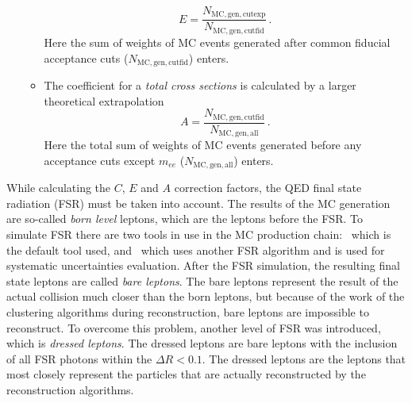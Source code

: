 \begin{itemize}
\begin{itemize}
\begin{equation}
  E = \frac{N_\mathrm{MC, gen, cutexp}}{N_\mathrm{MC, gen, cutfid}}\,.
\end{equation}
Here the sum of weights of MC events generated after common fiducial acceptance cuts ($N_\mathrm{MC, gen, cutfid}$) enters.
\item The coefficient for a \textit{total cross sections} is calculated by a larger theoretical extrapolation
\begin{equation}
  A = \frac{N_\mathrm{MC, gen, cutfid}}{N_\mathrm{MC, gen, all}}\,.
\end{equation}
Here the total sum of weights of MC events generated before any acceptance cuts except $m_{ee}$ ($N_\mathrm{MC, gen, all}$) enters.
\end{itemize}
\end{itemize}


While calculating the $C$, $E$ and $A$ correction factors, the QED final state radiation (FSR) must be taken into account. The results of the MC generation are so-called {\itshape born level} leptons, which are the leptons before the FSR. To simulate FSR there are two tools in use in the MC production chain: \Photos\, which is the default tool used, and \Sherpa\ which uses another FSR algorithm and is used for systematic uncertainties evaluation. After the FSR simulation, the resulting final state leptons are called {\itshape bare leptons}. The bare leptons represent the result of the actual collision much closer than the born leptons, but because of the work of the clustering algorithms during reconstruction, bare leptons are impossible to reconstruct. To overcome this problem, another level of FSR was introduced, which is {\itshape dressed leptons}. The dressed leptons are bare leptons with the inclusion of all FSR photons within the $\Delta R < 0.1$. The dressed leptons are the leptons that most closely represent the particles that are actually reconstructed by the reconstruction algorithms.


